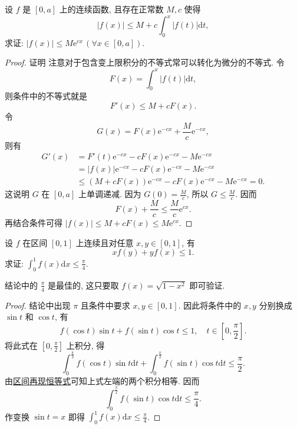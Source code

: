 \documentclass[../../main.tex]{subfiles}%
\begin{document}
\begin{example}
设 $f$ 是 $[0,a]$ 上的连续函数, 且存在正常数 $M,c$ 使得
$$|f(x)|\leqslant  M+c\int_0^x|f(t)|\mathrm{d}t,$$
求证: $|f(x)|\leqslant  M\mathrm{e}^{cx}\,(\forall x\in[0,a])$.
\end{example}
\begin{proof}

证明 注意对于包含变上限积分的不等式常可以转化为微分的不等式. 令
$$F(x)=\int_0^x|f(t)|\mathrm{d}t,$$
则条件中的不等式就是
$$F'(x)\leqslant  M+cF(x).$$
令
$$G(x)=F(x)\mathrm{e}^{-cx}+\frac{M}{c}\mathrm{e}^{-cx},$$
则有
$$
\begin{aligned}
G'(x) &= F'(t)\mathrm{e}^{-cx}-cF(x)\mathrm{e}^{-cx}-M\mathrm{e}^{-cx} \\
&= |f(x)|\mathrm{e}^{-cx}-cF(x)\mathrm{e}^{-cx}-M\mathrm{e}^{-cx} \\
&\leqslant  (M+cF(x))\mathrm{e}^{-cx}-cF(x)\mathrm{e}^{-cx}-M\mathrm{e}^{-cx}=0.
\end{aligned}
$$
这说明 $G$ 在 $[0,a]$ 上单调递减. 因为 $G(0)=\frac{M}{c}$, 所以 $G\leqslant \frac{M}{c}$. 因而
$$F(x)+\frac{M}{c}\leqslant \frac{M}{c}\mathrm{e}^{cx}.$$
再结合条件可得 $|f(x)|\leqslant  M+cF(x)\leqslant  M\mathrm{e}^{cx}$.

\end{proof}

\begin{example}
设 $f$ 在区间 $[0,1]$ 上连续且对任意 $x,y\in[0,1]$, 有
$$xf(y)+yf(x)\leqslant 1.$$
求证: $\int_0^1 f(x)\mathrm{d}x\leqslant \frac{\pi}{4}$.
\end{example}
\begin{remark}
结论中的 $\frac{\pi}{4}$ 是最佳的, 这只要取 $f(x)=\sqrt{1-x^2}$ 即可验证.
\end{remark}
\begin{proof}

结论中出现 $\pi$ 且条件中要求 $x,y\in[0,1]$. 因此将条件中的 $x,y$ 分别换成 $\sin t$ 和 $\cos t$, 有
$$f(\cos t)\sin t+f(\sin t)\cos t\leqslant 1,\quad t\in\left[0,\frac{\pi}{2}\right].$$
将此式在 $\left[0,\frac{\pi}{2}\right]$ 上积分, 得
$$\int_0^{\frac{\pi}{2}}f(\cos t)\sin t\mathrm{d}t+\int_0^{\frac{\pi}{2}}f(\sin t)\cos t\mathrm{d}t\leqslant \frac{\pi}{2}.$$
由\hyperref[theorem:区间再现恒等式]{区间再现恒等式}可知上式左端的两个积分相等. 因而
$$\int_0^{\frac{\pi}{2}}f(\sin t)\cos t\mathrm{d}t\leqslant \frac{\pi}{4}.$$
作变换 $\sin t=x$ 即得 $\int_0^1 f(x)\mathrm{d}x\leqslant \frac{\pi}{4}$.

\end{proof}
\end{document}
